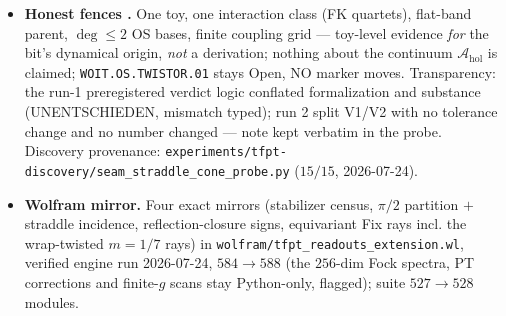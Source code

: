 \documentclass[11pt]{article}
\providecommand{\vref}[1]{\texttt{#1}}
\begin{document}
\begin{itemize}[leftmargin=1.5em]
{member}: stabilizer $=$ the full clock$+$mirror group (rotations $\{0,4,8,12\}$, reflection axes
$\{3,7,11,15\}$ $=$ four admissible bond cuts, straddled $\{7,15\}$), the four quartets \emph{partition}
the $16$-circle, and every straddling quartet is reflection-\emph{closed} across its cut with exact sign
$+1$; $m=2/6$ straddle asymmetrically; odd $m$ carry no bond axis (the typed \vref{v521}/\vref{v525}
placement artifact). $\operatorname{Fix}(G_\delta)$ is $1$-dimensional throughout: uniform on $m=2..6$,
NS-wrap-\emph{twisted} $(1,-1,1,1)/(-1,-1,-1,1)$ on the tight members $m=1/7$. Typed cross-link: the
RP-selected member $m=4$ is exactly the carrier of the \vref{v528} twist-class order parameter $O=1/2$ ---
the dynamical selector and the kinematic definition point at the \emph{same} member.
\item \textbf{Honest fences \mC.} One toy, one interaction class (FK quartets), flat-band parent,
$\deg\le2$ OS bases, finite coupling grid --- toy-level evidence \emph{for} the bit's dynamical origin,
\emph{not} a derivation; nothing about the continuum $\mathcal A_{\mathrm{hol}}$ is claimed;
\texttt{WOIT.OS.TWISTOR.01} stays Open, NO marker moves. Transparency: the run-1 preregistered verdict
logic conflated formalization and substance (UNENTSCHIEDEN, mismatch typed); run 2 split V1/V2 with no
tolerance change and no number changed --- note kept verbatim in the probe. Discovery provenance:
\texttt{experiments/tfpt-discovery/seam\_straddle\_cone\_probe.py} ($15/15$, 2026-07-24).
\item \textbf{Wolfram mirror.} Four exact mirrors (stabilizer census, $\pi/2$ partition $+$ straddle
incidence, reflection-closure signs, equivariant Fix rays incl. the wrap-twisted $m=1/7$ rays) in
\texttt{wolfram/tfpt\_readouts\_extension.wl}, verified engine run 2026-07-24, $584\to588$ (the $256$-dim
Fock spectra, PT corrections and finite-$g$ scans stay Python-only, flagged); suite $527\to528$ modules.
\end{itemize}
\end{document}
